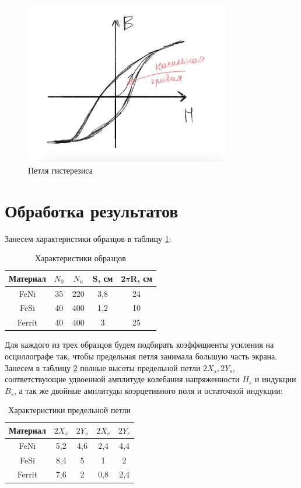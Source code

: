 \documentclass[a4paper, 12pt]{article}
\begin{document}
\begin{figure}[h]
    \centering
    \includegraphics[width=0.8\textwidth]{gist}
    \caption{Петля гистерезиса}
    \label{fig:gist}
\end{figure}

\section{Обработка результатов}

Занесем характеристики образцов в таблицу \ref{tab:chartics}:

\begin{table}[H]
	\centering
	\begin{tabular}{|c|c|c|c|c|}
	\hline
	Материал & $N_0$ & $N_u$ & S, см & 2$\pi$R, см \\ \hline
	FeNi     & 35   & 220  & 3,8   & 24       \\ \hline
	FeSi     & 40   & 400  & 1,2   & 10       \\ \hline
	Ferrit   & 40   & 400  & 3     & 25       \\ \hline
	\end{tabular}
	\caption{Характеристики образцов}
	\label{tab:chartics}
	\end{table}

Для каждого из трех образцов будем подбирать коэффициенты усиления на осциллографе так, чтобы предельная
петля занимала большую часть экрана. Занесем в таблицу \ref{tab:axes} полные высоты предельной петли
$2X_s, 2Y_s$, соответствующие удвоенной амплитуде колебания напряженности $H_s$ и индукции $B_s$, а так же 
двойные амплитуды коэрцетивного поля и остаточной индукции:

\begin{table}[H]
	\centering
	\begin{tabular}{|c|c|c|c|c|}
	\hline
	Материал & {$2X_s$} & $2Y_s$ & $2X_c$ & $2Y_r$ \\ \hline
	FeNi                   & 5,2                      & 4,6 & 2,4 & 4,4 \\ \hline
	FeSi                   & 8,4                      & 5   & 1   & 2   \\ \hline
	Ferrit                 & 7,6                      & 2   & 0,8 & 2,4 \\ \hline
	\end{tabular}
	\caption{Характеристики предельной петли}
	\label{tab:axes}
\end{table}
\end{document}
